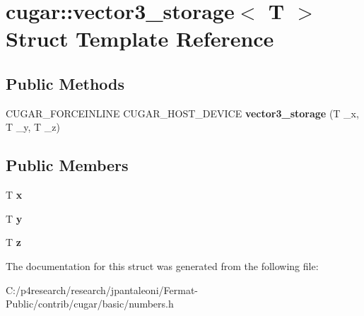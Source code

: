 \hypertarget{structcugar_1_1vector3__storage}{}\section{cugar\+:\+:vector3\+\_\+storage$<$ T $>$ Struct Template Reference}
\label{structcugar_1_1vector3__storage}
\subsection*{Public Methods}
\begin{DoxyCompactItemize}
\item 
\mbox{\label{structcugar_1_1vector3__storage_a016c8f8d5ef32e9f6dbea75c027012b7}} 
C\+U\+G\+A\+R\+\_\+\+F\+O\+R\+C\+E\+I\+N\+L\+I\+NE C\+U\+G\+A\+R\+\_\+\+H\+O\+S\+T\+\_\+\+D\+E\+V\+I\+CE {\bfseries vector3\+\_\+storage} (T \+\_\+x, T \+\_\+y, T \+\_\+z)
\end{DoxyCompactItemize}
\subsection*{Public Members}
\begin{DoxyCompactItemize}
\item 
\mbox{\label{structcugar_1_1vector3__storage_aaa458b139321e64a44da5368c88cc216}} 
T {\bfseries x}
\item 
\mbox{\label{structcugar_1_1vector3__storage_a475915f768d89d9b6cda1846c8b6b067}} 
T {\bfseries y}
\item 
\mbox{\label{structcugar_1_1vector3__storage_abfb09512bbecf5974d44ee3cab15515b}} 
T {\bfseries z}
\end{DoxyCompactItemize}


The documentation for this struct was generated from the following file\+:\begin{DoxyCompactItemize}
\item 
C\+:/p4research/research/jpantaleoni/\+Fermat-\/\+Public/contrib/cugar/basic/numbers.\+h\end{DoxyCompactItemize}
